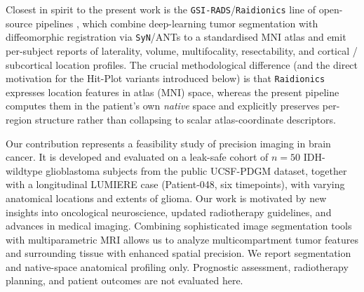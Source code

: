 \documentclass[a4paper,11pt,leqno]{article}
\begin{document}
Closest in spirit to the present work is the
\texttt{GSI-RADS}/\texttt{Raidionics} line of open-source pipelines
\cite{Bouget2023a,Bouget2022,Bouget2021,HoldenHelland2023,Kommers2021},
which combine deep-learning tumor segmentation with diffeomorphic
registration via \texttt{SyN}/ANTs \cite{Avants2011} to a standardised
MNI atlas \cite{Giff2023} and emit per-subject reports of laterality,
volume, multifocality, resectability, and cortical / subcortical
location profiles. The crucial methodological difference (and the
direct motivation for the Hit-Plot variants introduced below) is that
\texttt{Raidionics} expresses location features in atlas (MNI) space,
whereas the present pipeline computes them in the patient's own
\emph{native} space and explicitly preserves per-region structure rather
than collapsing to scalar atlas-coordinate descriptors.


Our contribution represents a feasibility study of precision imaging in brain cancer. It is developed and evaluated on a leak-safe cohort of $n=50$ IDH-wildtype glioblastoma subjects from the public UCSF-PDGM dataset, together with a longitudinal LUMIERE case (Patient-048, six timepoints), with varying anatomical locations and extents of glioma. Our work is motivated by new insights into oncological neuroscience, updated radiotherapy guidelines, and advances in medical imaging. Combining sophisticated image segmentation tools with multiparametric MRI allows us to analyze multicompartment tumor features and surrounding tissue with enhanced spatial precision. We report segmentation and native-space anatomical profiling only. Prognostic assessment, radiotherapy planning, and patient outcomes are not evaluated here.
\end{document}
